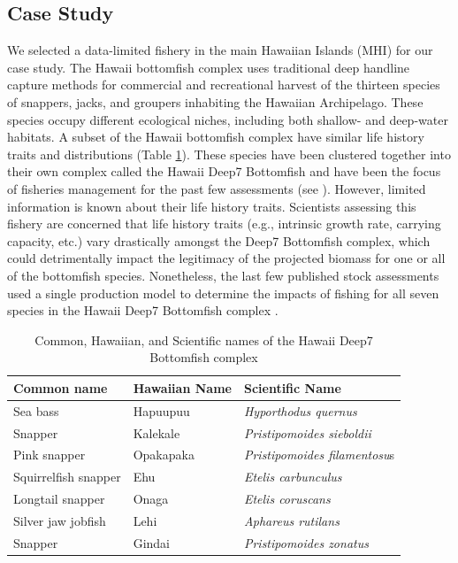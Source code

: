 \documentclass[oneside,12pt,final]{sty/ucthesis-CA2012}
\let\cite\citep                             %
\begin{document}
\begin{mainmatter}
\subsection*{Case Study}
We selected a data-limited fishery in the main Hawaiian Islands (MHI) for our case study. The Hawaii bottomfish complex uses traditional deep handline capture methods for commercial and recreational harvest of the thirteen species of snappers, jacks, and groupers inhabiting the Hawaiian Archipelago. These species occupy different ecological niches, including both shallow- and deep-water habitats. A subset of the Hawaii bottomfish complex have similar life history traits and distributions (Table \ref{names}). These species have been clustered together into their own complex called the Hawaii Deep7 Bottomfish and have been the focus of fisheries management for the past few assessments (see \citealt{langseth2018stock}). However, limited information is known about their life history traits. Scientists assessing this fishery are concerned that life history traits (e.g., intrinsic growth rate, carrying capacity, etc.) vary drastically amongst the Deep7 Bottomfish complex, which could detrimentally impact the legitimacy of the projected biomass for one or all of the bottomfish species. Nonetheless, the last few published stock assessments used a single production model to determine the impacts of fishing for all seven species in the Hawaii Deep7 Bottomfish complex  \cite{brodziak2009hawaiian,langseth2018stock}. 

\begin{table}[H]
\centering
\caption{Common, Hawaiian, and Scientific names of the Hawaii Deep7 Bottomfish complex}
\begin{tabular}{lll}
  \hline \small
 Common name & Hawaiian Name & Scientific Name \\ 
   \hline
Sea bass & Hapuupuu & \textit{Hyporthodus quernus} \\
Snapper & Kalekale & \textit{Pristipomoides sieboldii} \\
Pink snapper & Opakapaka & \textit{Pristipomoides filamentosu}s \\
Squirrelfish snapper & Ehu & \textit{Etelis carbunculus} \\
Longtail snapper & Onaga & \textit{Etelis coruscans} \\
Silver jaw jobfish & Lehi & \textit{Aphareus rutilans} \\
Snapper & Gindai & \textit{Pristipomoides zonatus} \\
   \hline
\end{tabular} 
\label{names}
\end{table}


\end{mainmatter}
\end{document}

